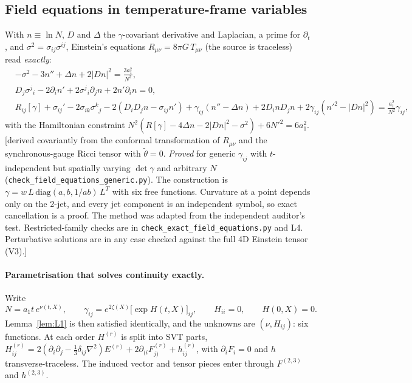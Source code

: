 \documentclass[11pt]{article}
\theoremstyle{definition}
\theoremstyle{remark}
\newcommand{\status}[1]{\textsf{[#1]}}
\begin{document}
\subsection{Field equations in temperature-frame variables}
With $n\equiv\ln N$, $D$ and $\Delta$ the $\gamma$-covariant derivative and
Laplacian, a prime for $\partial_t$, and $\sigma^2=\sigma_{ij}\sigma^{ij}$,
Einstein's equations $R_{\mu\nu}=8\pi G\,T_{\mu\nu}$ (the source is
traceless) read \emph{exactly}:
\begin{align}
&-\sigma^2-3n''+\Delta n+2|Dn|^2=\frac{3a_1^2}{N^2},\label{eq:E00}\\
&D_j\sigma^j{}_i-2\partial_in'+2\sigma^j{}_i\partial_jn+2n'\partial_in=0,\label{eq:E0i}\\
&R_{ij}[\gamma]+\sigma_{ij}'-2\sigma_{ik}\sigma^k{}_j-2(D_iD_jn-\sigma_{ij}n')
+\gamma_{ij}(n''-\Delta n)+2D_inD_jn+2\gamma_{ij}(n'^2-|Dn|^2)=\frac{a_1^2}{N^2}\gamma_{ij},\label{eq:Eij}
\end{align}
with the Hamiltonian constraint
$N^2(R[\gamma]-4\Delta n-2|Dn|^2-\sigma^2)+6N'^2=6a_1^2$.
\status{derived covariantly from the conformal transformation of
$R_{\mu\nu}$ and the synchronous-gauge Ricci tensor with $\tilde\theta=0$.
\emph{Proved} for generic $\gamma_{ij}$ with $t$-independent but spatially
varying $\det\gamma$ and arbitrary $N$ (\texttt{check\_field\_equations\_generic.py}).
The construction is $\gamma=w\,L\,\mathrm{diag}(a,b,1/ab)\,L^{T}$ with six
free functions. Curvature at a point depends only on the 2-jet, and every
jet component is an independent symbol, so exact cancellation is a proof.
The method was adapted from the independent auditor's test. Restricted-family
checks are in \texttt{check\_exact\_field\_equations.py} and L4. Perturbative
solutions are in any case checked against the full 4D Einstein tensor
(V3).}

\paragraph{Parametrisation that solves continuity exactly.} Write
\[
N=a_1t\,e^{\nu(t,X)},\qquad
\gamma_{ij}=e^{2\zeta(X)}\big[\exp H(t,X)\big]_{ij},\qquad H_{ii}=0,\qquad H(0,X)=0.
\]
Lemma~\ref{lem:L1} is then satisfied identically, and the unknowns are
$(\nu,H_{ij})$: six functions. At each order $H^{(r)}$ is split into SVT
parts, $H^{(r)}_{ij}=2(\partial_i\partial_j-\tfrac13\delta_{ij}\nabla^2)E^{(r)}
+2\partial_{(i}F^{(r)}_{j)}+h^{(r)}_{ij}$, with $\partial_iF_i=0$ and $h$
transverse-traceless. The induced vector and tensor pieces enter through
$F^{(2,3)}$ and $h^{(2,3)}$.
\end{document}
